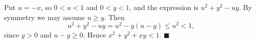 Put $u=-x$, so $0<u<1$ and $0<y<1$, and the expression is $u^2+y^2-uy$. By symmetry we may assume $u\ge y$. Then
\[
u^2+y^2-uy=u^2-y(u-y)\le u^2<1,
\]
since $y>0$ and $u-y\ge0$. Hence $x^2+y^2+xy<1$. $\blacksquare$
